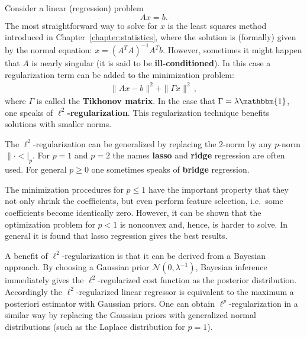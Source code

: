     \begin{method}{
        Consider a linear (regression) problem \[Ax = b.\] The most straightforward way to solve for $x$ is the least squares method introduced in Chapter~\ref{chapter:statistics}, where the solution is (formally) given by the normal equation: $x=(A^TA)^{-1}A^Tb$. However, sometimes it might happen that $A$ is nearly singular (it is said to be \textbf{ill-conditioned}). In this case a regularization term can be added to the minimization problem:
        \begin{gather}
            \|Ax-b\|^2+\|\Gamma x\|^2\,,
        \end{gather}
        where $\Gamma$ is called the \textbf{Tikhonov matrix}. In the case that $\Gamma=\lambda\mathbbm{1}$, one speaks of \textbf{$\ell^2$-regularization}. This regularization technique benefits solutions with smaller norms.
    }
    \end{method}
    \begin{remark}
        The $\ell^2$-regularization can be generalized by replacing the 2-norm by any $p$-norm $\|\cdot<|_p$. For $p=1$ and $p=2$ the names \textbf{lasso} and \textbf{ridge} regression are often used. For general $p\geq0$ one sometimes speaks of \textbf{bridge} regression.

        The minimization procedures for $p\leq1$ have the important property that they not only shrink the coefficients, but even perform feature selection, i.e.~some coefficients become identically zero. However, it can be shown that the optimization problem for $p<1$ is nonconvex and, hence, is harder to solve. In general it is found that lasso regression gives the best results.

        A benefit of $\ell^2$-regularization is that it can be derived from a Bayesian approach. By choosing a Gaussian prior $\mathcal{N}(0,\lambda^{-1})$, Bayesian inference immediately gives the $\ell^2$-regularized cost function as the posterior distribution. Accordingly the $\ell^2$-regularized linear regressor is equivalent to the maximum a posteriori estimator with Gaussian priors. One can obtain $\ell^p$-regularization in a similar way by replacing the Gaussian priors with generalized normal distributions (such as the Laplace distribution for $p=1$).
    \end{remark}

